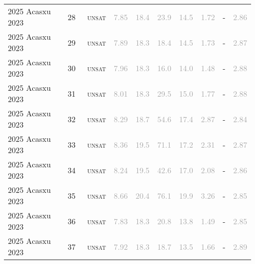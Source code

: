 \begin{center}
{\begin{longtable}{@{}llllllllll@{}}
2025 Acasxu 2023 & 28 & ~\textsc{unsat} & \textcolor{darkgray}{7.85} & \textcolor{darkgray}{18.4} & \textcolor{darkgray}{23.9} & \textcolor{darkgray}{14.5} & \textcolor{darkgray}{1.72} & - & \textcolor{darkgray}{2.86} \\
2025 Acasxu 2023 & 29 & ~\textsc{unsat} & \textcolor{darkgray}{7.89} & \textcolor{darkgray}{18.3} & \textcolor{darkgray}{18.4} & \textcolor{darkgray}{14.5} & \textcolor{darkgray}{1.73} & - & \textcolor{darkgray}{2.87} \\
2025 Acasxu 2023 & 30 & ~\textsc{unsat} & \textcolor{darkgray}{7.96} & \textcolor{darkgray}{18.3} & \textcolor{darkgray}{16.0} & \textcolor{darkgray}{14.0} & \textcolor{darkgray}{1.48} & - & \textcolor{darkgray}{2.88} \\
2025 Acasxu 2023 & 31 & ~\textsc{unsat} & \textcolor{darkgray}{8.01} & \textcolor{darkgray}{18.3} & \textcolor{darkgray}{29.5} & \textcolor{darkgray}{15.0} & \textcolor{darkgray}{1.77} & - & \textcolor{darkgray}{2.88} \\
2025 Acasxu 2023 & 32 & ~\textsc{unsat} & \textcolor{darkgray}{8.29} & \textcolor{darkgray}{18.7} & \textcolor{darkgray}{54.6} & \textcolor{darkgray}{17.4} & \textcolor{darkgray}{2.87} & - & \textcolor{darkgray}{2.84} \\
2025 Acasxu 2023 & 33 & ~\textsc{unsat} & \textcolor{darkgray}{8.36} & \textcolor{darkgray}{19.5} & \textcolor{darkgray}{71.1} & \textcolor{darkgray}{17.2} & \textcolor{darkgray}{2.31} & - & \textcolor{darkgray}{2.87} \\
2025 Acasxu 2023 & 34 & ~\textsc{unsat} & \textcolor{darkgray}{8.24} & \textcolor{darkgray}{19.5} & \textcolor{darkgray}{42.6} & \textcolor{darkgray}{17.0} & \textcolor{darkgray}{2.08} & - & \textcolor{darkgray}{2.86} \\
2025 Acasxu 2023 & 35 & ~\textsc{unsat} & \textcolor{darkgray}{8.66} & \textcolor{darkgray}{20.4} & \textcolor{darkgray}{76.1} & \textcolor{darkgray}{19.9} & \textcolor{darkgray}{3.26} & - & \textcolor{darkgray}{2.85} \\
2025 Acasxu 2023 & 36 & ~\textsc{unsat} & \textcolor{darkgray}{7.83} & \textcolor{darkgray}{18.3} & \textcolor{darkgray}{20.8} & \textcolor{darkgray}{13.8} & \textcolor{darkgray}{1.49} & - & \textcolor{darkgray}{2.85} \\
2025 Acasxu 2023 & 37 & ~\textsc{unsat} & \textcolor{darkgray}{7.92} & \textcolor{darkgray}{18.3} & \textcolor{darkgray}{18.7} & \textcolor{darkgray}{13.5} & \textcolor{darkgray}{1.66} & - & \textcolor{darkgray}{2.89} \\

\end{longtable}}
\end{center}
